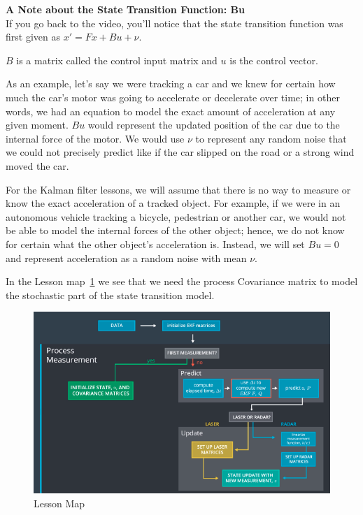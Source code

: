 \documentclass[11pt, a4paper]{article}
\begin{document}
\textbf{A Note about the State Transition Function: Bu} \\

If you go back to the video, you'll notice that the state transition function was first given as $x' = Fx + Bu + \nu$.

$B$ is a matrix called the control input matrix and $u$ is the control vector.


As an example, let's say we were tracking a car and we knew for certain how much the car's motor was going to accelerate or decelerate over time; in other words, we had an equation to model the exact amount of acceleration at any given moment. $Bu$ would represent the updated position of the car due to the internal force of the motor. We would use $\nu$ to represent any random noise that we could not precisely predict like if the car slipped on the road or a strong wind moved the car.

For the Kalman filter lessons, we will assume that there is no way to measure or know the exact acceleration of a tracked object. For example, if we were in an autonomous vehicle tracking a bicycle, pedestrian or another car, we would not be able to model the internal forces of the other object; hence, we do not know for certain what the other object's acceleration is. Instead, we will set $Bu = 0$ and represent acceleration as a random noise with mean $\nu$.



In the Lesson map~\ref{fig:lesson_map} we see that we need the process Covariance matrix to model the stochastic part of the state transition model. 
\begin{figure}[htpb!]
	\centering
	\includegraphics[width=0.8\linewidth]{lesson_map}
	\caption{Lesson Map}
	\label{fig:lesson_map}
\end{figure}
\end{document}
